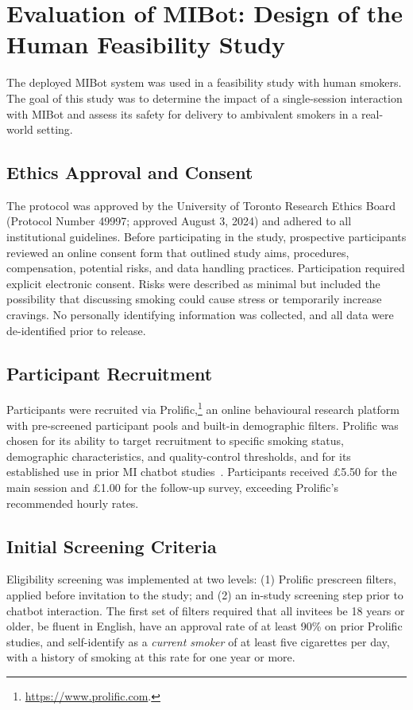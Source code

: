 \chapter{Evaluation of MIBot: Design of the Human Feasibility Study}
\label{ch:feasibility}
\label{ch:mibot-feasibility-study}
The deployed MIBot system was used in a feasibility study with human smokers. The goal of this study was to determine the impact of a single-session interaction with MIBot and assess its safety for delivery to ambivalent smokers in a real-world setting.

\section{Ethics Approval and Consent}
The protocol was approved by the University of Toronto Research Ethics Board (Protocol
Number 49997; approved August 3, 2024) \citep{rose2025ethics} and adhered to all
institutional guidelines. Before participating in the study, prospective participants
reviewed an online consent form that outlined study aims, procedures, compensation,
potential risks, and data handling practices. Participation required explicit
electronic consent. Risks were described as minimal but included the possibility that
discussing smoking could cause stress or temporarily increase cravings. No personally
identifying information was collected, and all data were de-identified prior to
release.

\section{Participant Recruitment}
\label{sec:recruitment}
Participants were recruited via Prolific,\footnote{\url{https://www.prolific.com}.} an online behavioural research platform with pre-screened participant pools and built-in demographic filters. Prolific was chosen for its ability to target recruitment to specific smoking status, demographic characteristics, and quality-control thresholds, and for its established use in prior MI chatbot studies~\citep{brown2023mi,info:doi/10.2196/20251}. Participants received \pounds5.50 for the main session and \pounds1.00 for the follow-up survey, exceeding Prolific's recommended hourly rates.

\section{Initial Screening Criteria}
Eligibility screening was implemented at two levels: (1) Prolific prescreen filters,
applied before invitation to the study; and (2) an in-study screening step prior to
chatbot interaction. The first set of filters required that all invitees be 18 years or
older, be fluent in English, have an approval rate of at least 90\% on prior Prolific
studies, and self-identify as a \emph{current smoker} of at least five cigarettes per
day, with a history of smoking at this rate for one year or more.

